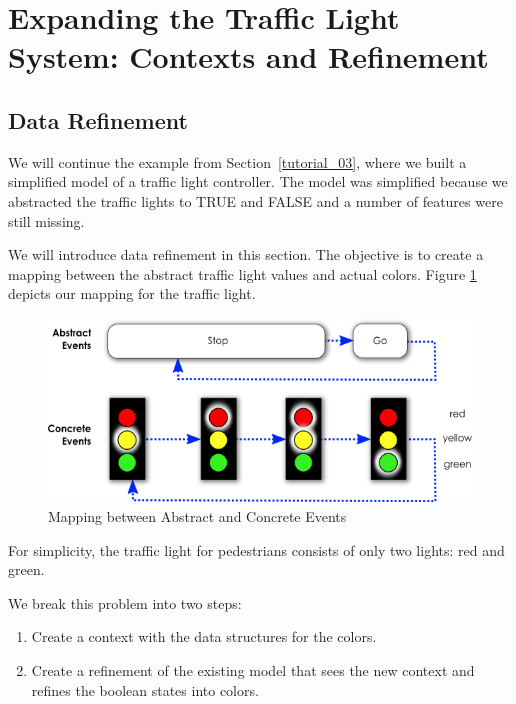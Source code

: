 \section{Expanding the Traffic Light System: Contexts and Refinement}
\label{tutorial_07}


\subsection{Data Refinement}
\label{tutorial:data_refinement}

We will continue the example from Section~\ref{tutorial_03}, where we built a simplified model of a traffic light controller.  The model was simplified because we abstracted the traffic lights to TRUE and FALSE and a number of features were still missing.

We will introduce data refinement in this section.  The objective is to create a mapping between the abstract traffic light values and actual colors. Figure \ref{fig_tut_07_tl_colors} depicts our mapping for the traffic light.

\begin{figure}[!h]
\begin{center}
	\includegraphics{img/tutorial/tl-colors.png}
	\caption{Mapping between Abstract and Concrete Events}
	\label{fig_tut_07_tl_colors}
\end{center}
\end{figure}

For simplicity, the traffic light for pedestrians consists of only two lights: red and green.

We break this problem into two steps:

\begin{enumerate}
	\item Create a context with the data structures for the colors.
	\item Create a refinement of the existing model that sees the new context and refines the boolean states into colors.
\end{enumerate}

